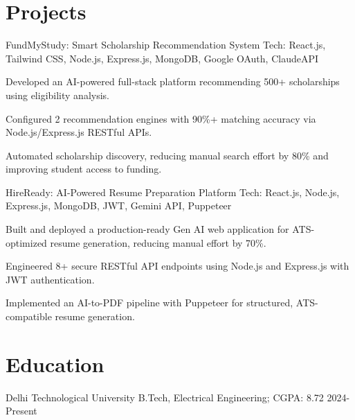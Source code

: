 \documentclass[a4paper,10pt]{article}
\begin{document}
\vspace{-5pt}


\section{Projects}


\resumeSubheading
{FundMyStudy: Smart Scholarship Recommendation System}
{}
{Tech: React.js, Tailwind CSS, Node.js, Express.js, MongoDB, Google OAuth, ClaudeAPI}
{}

\resumeItemListStart
\item Developed an AI-powered full-stack platform recommending 500+ scholarships using eligibility analysis.
\item Configured 2 recommendation engines with 90\%+ matching accuracy via Node.js/Express.js RESTful APIs.
\item Automated scholarship discovery, reducing manual search effort by 80\% and improving student access to funding.
\resumeItemListEnd

\vspace{-5pt}


\resumeSubheading
{HireReady: AI-Powered Resume Preparation Platform}
{}
{Tech: React.js, Node.js, Express.js, MongoDB, JWT, Gemini API, Puppeteer}
{}

\resumeItemListStart
\item Built and deployed a production-ready Gen AI web application for ATS-optimized resume generation, reducing manual effort by 70\%.
\item Engineered 8+ secure RESTful API endpoints using Node.js and Express.js with JWT authentication.
\item Implemented an AI-to-PDF pipeline with Puppeteer for structured, ATS-compatible resume generation.
\resumeItemListEnd

\vspace{-5pt}


\section{Education}


\resumeSubheading
{Delhi Technological University}
{}
{B.Tech, Electrical Engineering; CGPA: 8.72}
{2024-Present}
\end{document}
